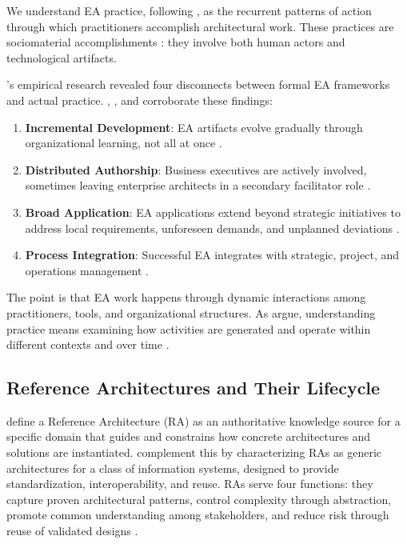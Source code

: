 We understand EA practice, following \textcite{feldman_theorizing_2011}, as the
recurrent patterns of action through which practitioners accomplish
architectural work. These practices are sociomaterial accomplishments
\parencite{orlikowski_sociomaterial_2007}: they involve both human actors and
technological artifacts.

\textcite{kotusev_enterprise_2018}'s empirical research revealed four
disconnects between formal EA frameworks and actual practice.
\textcite{ross_enterprise_2006}, \textcite{fonstad_n_o_transforming_2006}, and
\textcite{ahlemann_strategic_2012} corroborate these findings:

\begin{enumerate}
      \item \textbf{Incremental Development}: EA artifacts evolve gradually
            through organizational learning, not all at once
            \parencite{kotusev_enterprise_2018}.
      \item \textbf{Distributed Authorship}: Business executives are actively
            involved, sometimes leaving enterprise architects in a secondary
            facilitator role
            \parencite{kotusev_enterprise_2018, ross_enterprise_2006}.
      \item \textbf{Broad Application}: EA applications extend beyond strategic
            initiatives to address local requirements, unforeseen demands, and
            unplanned deviations \parencite{fonstad_n_o_transforming_2006}.
      \item \textbf{Process Integration}: Successful EA integrates with
            strategic, project, and operations management
            \parencite{ahlemann_strategic_2012}.
\end{enumerate}

The point is that EA work happens through dynamic interactions among
practitioners, tools, and organizational structures. As
\textcite{feldman_theorizing_2011} argue, understanding practice means examining
how activities are generated and operate within different contexts and over time
\parencite[p.~1241]{feldman_theorizing_2011}.

\subsection{Reference Architectures and Their Lifecycle}\label{subsec:reference-architectures}

\textcite{cloutier_concept_2010} define a Reference Architecture (RA) as an
authoritative knowledge source for a specific domain that guides and constrains
how concrete architectures and solutions are instantiated.
\textcite{angelov_framework_2012} complement this by characterizing RAs as
generic architectures for a class of information systems, designed to provide
standardization, interoperability, and reuse. RAs serve four functions: they
capture proven architectural patterns, control complexity through abstraction,
promote common understanding among stakeholders, and reduce risk through reuse
of validated designs \parencite{cloutier_concept_2010}.

